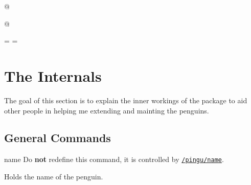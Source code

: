 \documentclass[parskip=half,english,numbers=noenddot,footnotes=nomultiple,oneside]{scrartcl}
\makeatletter
\def\current@indexfile{\jobname}
\let\@gobblekey\@gobble
\def\lpingu#1{\lstinline[style=lstpingu,language=pingulang]'#1'}
\let\@explainsuff\@empty
\let\@labelhack\@empty
\newcommand*\keyref[2][/pingu/]{\hyperref[pk:#1#2]{\lpingu{#1#2}}}
\newenvironment{commandexplain}[3][]{%
\begingroup
\def\@labelhack{/pingu/}%
\def\mand##1{\texttt{\{\textsf{\smaller##1}\}}}%
\def\@pingu@command@keypartner{#1}%
\newcommand\opt[2][]{\texttt{\textit{[\textsf{\smaller##2\ifx!##1!\else\textcolor{gray}{\smaller\sffamily=##1}\fi}]}}}%
\def\@explainsuff{#3}%
\keyexplain[]{\\#2}{}{}%
\ifx\@pingu@command@keypartner\@empty\else
{\@declaredcolor{gray}\footnotesize Do \textbf{not} redefine this command, it is controlled by \keyref{#1}.}\par\fi
}{\endkeyexplain\endgroup}
\makeatother
\begin{document}
\begin{tcblisting}{@}
\begin{tikzpicture}
	\pingu[second shirt, second shirt raise=5mm]
\end{tikzpicture}
\end{tcblisting}
\endsubkeyexplain

{\def\pingu@color@secondshirt{<second-shirt-color>}
\begin{tcblisting}{@}
\begin{tikzpicture}
	\pingu[second shirt, second shirt neck=green]
\end{tikzpicture}
\end{tcblisting}
\endsubkeyexplain}


\newcommand\includecode[2][../tex/tikzpingus.sty]{}
\def\current@indexfile{\jobname-internals}
\def\@gobblekey#1{%
	\IfBeginWith{#1}{pingu@}{%
		\StrDel[1]{#1}{pingu@}[#1]\protected@xdef#1{#1}%
	}{%
	\IfBeginWith{#1}{@pingu@}{%
		\StrDel[1]{#1}{@pingu@}[#1]\protected@xdef#1{#1}%
	}{}%
}}
\newsavebox\warningpengu
{}=\hbox{}
\setbox\warningpengu=\hbox{}
\def\important{\par\mbox{\textit{Important:}\marginnote{\usebox\warningpengu}}}

\section{The Internals}
The goal of this section is to explain the inner workings of the package to aid other people in helping me extending and mainting the penguins.

\subsection{General Commands}

\begin{commandexplain}[name]{pingu@name}{}
	Holds the name of the penguin.
\end{commandexplain}
\end{document}
